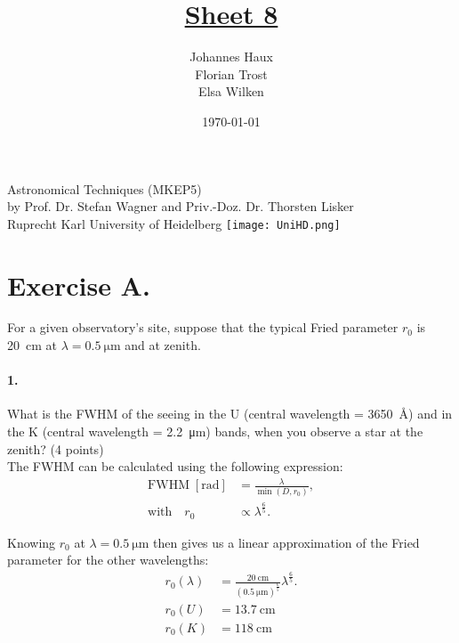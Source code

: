 \documentclass[11pt,a4paper,twoside]{article}
\title{\LARGE \underline {Sheet 8}}
\author{Johannes Haux \\ Florian Trost \\ Elsa Wilken}
\date{\today}
\newcommand{\op}[1]{\operatorname{#1}}
\begin{document}
\maketitle
\thispagestyle{empty}

\begin{center}
  Astronomical Techniques (MKEP5) \\
  \baselineskip35pt
  by Prof. Dr. Stefan Wagner and Priv.-Doz. Dr. Thorsten Lisker \\
  \baselineskip60pt
  Ruprecht Karl University of Heidelberg
\vskip 40pt
\texttt{[image: UniHD.png]}

\end{center}

\newpage
\setcounter{page}{1}		%

\section*{Exercise A.}
For a given observatory's site, suppose that the typical Fried parameter $r_0$
is \SI{20}{\centi\meter} at $\lambda = \SI{0.5}{\micro\meter}$ and at zenith.  

\paragraph{1.} What is the FWHM of the seeing in the U (central wavelength =
\SI{3650}{\angstrom}) and in the K (central wavelength =
\SI{2.2}{\micro\meter}) bands, when you observe a star at the zenith? (4
points) \\

The FWHM can be calculated using the following expression:
\begin{align}
\mathrm{FWHM} \;[\si{\radian}] &= \frac{\lambda}{\op{min}\left(D, r_0 \right)}, \label{eq:S0} \\
\text{with} \quad r_0 &\propto \lambda^{\frac{6}{5}}.
\end{align}

Knowing $r_0$ at $\lambda = \SI{0.5}{\micro\meter}$ then gives us a linear 
approximation of the Fried parameter for the other wavelengths:
\begin{align}
r_0(\lambda) &= \frac{\SI{20}{\centi\meter}}
                     {\left(\SI{0.5}{\micro\meter}\right)^{\frac{6}{5}}}
                \lambda^{\frac{6}{5}}. \label{eq:r0} \\ 
r_0(U) &= \SI{13.7}{\centi\meter}   \\
r_0(K) &= \SI{118}{\centi\meter}
\end{align}
\end{document}
